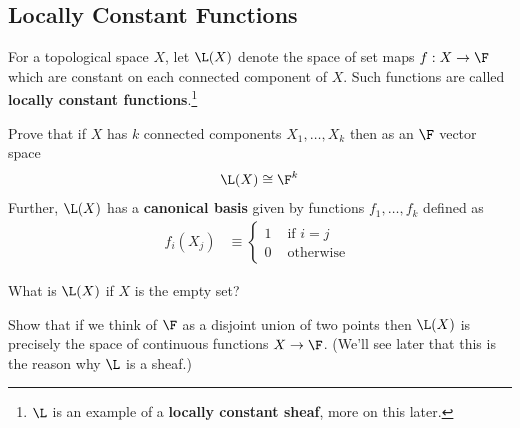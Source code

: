 


\subsection{Locally Constant Functions}
\begin{definition}
  For a topological space $ X$, let $ \L(X)$ denote the space of set maps $ f: X \rightarrow \F$ which are constant on each connected component of $ X$. Such functions are called \textbf{locally constant functions}.\footnote{$\L$ is an example of a \textbf{locally constant sheaf}, more on this later. }
\end{definition}
\begin{ques}
  Prove that if  $ X$ has $ k$ connected components $ X_1, \dots, X_k$ then as an $ \F$ vector space
  \begin{align*}
    \L(X) \cong \F^k
  \end{align*}
  Further, $ \L(X)$ has a \textbf{canonical basis} given by functions $ f_1, \dots, f_k$ defined as
  \begin{align*}
    f_i(X_j) & \equiv
    \begin{cases}
      1 & \mbox{ if } i=j \\ 0 & \mbox{ otherwise }
    \end{cases}
  \end{align*}
\end{ques}

\begin{ques}
  What is $ \L(X)$ if $ X$ is the empty set?
\end{ques}

\begin{ques}
  Show that if we think of $ \F$ as a disjoint union of two points then $ \L(X)$ is precisely the space of continuous functions $ X \rightarrow \F$. (We'll see later that this is the reason why $\L$ is a sheaf.)
\end{ques}



